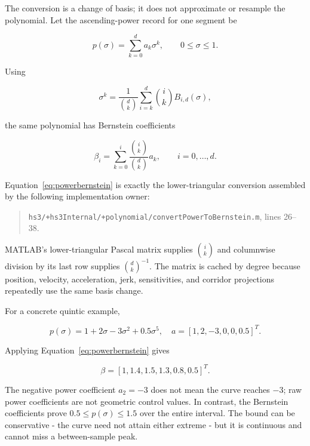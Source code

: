 \documentclass[10pt,letterpaper]{article}
\newcommand{\file}[1]{\nolinkurl{#1}}
\begin{document}
The conversion is a change of basis; it does not approximate or resample the
polynomial. Let the ascending-power record for one segment be

\begin{equation}
p(\sigma)=\sum_{k=0}^{d}a_k\sigma^k,
\qquad 0\le\sigma\le1.
\end{equation}

Using

\begin{equation}
\sigma^k=\frac{1}{\binom{d}{k}}
\sum_{i=k}^{d}\binom{i}{k}B_{i,d}(\sigma),
\end{equation}

the same polynomial has Bernstein coefficients

\begin{equation}\label{eq:powerbernstein}
\boxed{\displaystyle
\beta_i=\sum_{k=0}^{i}
\frac{\binom{i}{k}}{\binom{d}{k}}a_k},
\qquad i=0,\ldots,d.
\end{equation}

Equation~\eqref{eq:powerbernstein} is exactly the lower-triangular conversion
assembled by the following implementation owner:

\begin{quote}\small
\file{hs3/+hs3Internal/+polynomial/convertPowerToBernstein.m}, lines 26--38.
\end{quote}

MATLAB's lower-triangular Pascal matrix supplies $\binom{i}{k}$ and columnwise
division by its last row supplies $\binom{d}{k}^{-1}$. The matrix is cached by
degree because position, velocity, acceleration, jerk, sensitivities, and
corridor projections repeatedly use the same basis change.

For a concrete quintic example,

\begin{equation}
p(\sigma)=1+2\sigma-3\sigma^2+0.5\sigma^5,
\quad
a=[1,2,-3,0,0,0.5]^T.
\end{equation}

Applying Equation~\eqref{eq:powerbernstein} gives

\begin{equation}
\beta=[1,1.4,1.5,1.3,0.8,0.5]^T.
\end{equation}

The negative power coefficient $a_2=-3$ does not mean the curve reaches
$-3$; raw power coefficients are not geometric control values. In contrast,
the Bernstein coefficients prove $0.5\le p(\sigma)\le1.5$ over the entire
interval. The bound can be conservative - the curve need not attain either
extreme - but it is continuous and cannot miss a between-sample peak.
\end{document}
